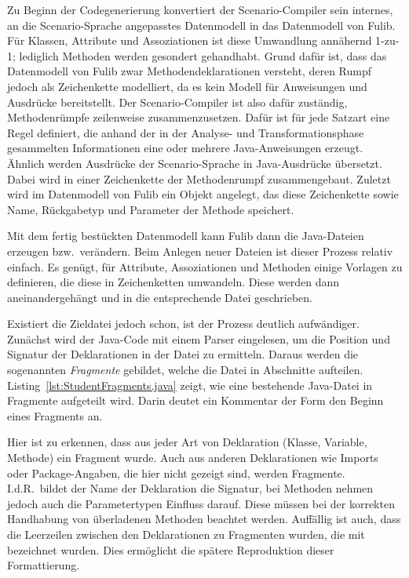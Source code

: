 Zu Beginn der Codegenerierung konvertiert der Scenario-Compiler sein internes, an die Scenario-Sprache angepasstes Datenmodell in das Datenmodell von Fulib.
Für Klassen, Attribute und Assoziationen ist diese Umwandlung annähernd 1-zu-1;
lediglich Methoden werden gesondert gehandhabt.
Grund dafür ist, dass das Datenmodell von Fulib zwar Methodendeklarationen versteht,
deren Rumpf jedoch als Zeichenkette modelliert,
da es kein Modell für Anweisungen und Ausdrücke bereitstellt.
Der Scenario-Compiler ist also dafür zuständig, Methodenrümpfe zeilenweise zusammenzusetzen.
Dafür ist für jede Satzart eine Regel definiert, die anhand der in der Analyse- und Transformationsphase gesammelten Informationen eine oder mehrere Java-Anweisungen erzeugt.
Ähnlich werden Ausdrücke der Scenario-Sprache in Java-Ausdrücke übersetzt.
Dabei wird in einer Zeichenkette der Methodenrumpf zusammengebaut.
Zuletzt wird im Datenmodell von Fulib ein Objekt angelegt, das diese Zeichenkette sowie Name, Rückgabetyp und Parameter der Methode speichert.

Mit dem fertig bestückten Datenmodell kann Fulib dann die Java-Dateien erzeugen bzw.\ verändern.
Beim Anlegen neuer Dateien ist dieser Prozess relativ einfach.
Es genügt, für Attribute, Assoziationen und Methoden einige Vorlagen zu definieren,
die diese in Zeichenketten umwandeln.
Diese werden dann aneinandergehängt und in die entsprechende Datei geschrieben.

Existiert die Zieldatei jedoch schon, ist der Prozess deutlich aufwändiger.
Zunächst wird der Java-Code mit einem Parser eingelesen, um die Position und Signatur der Deklarationen in der Datei zu ermitteln.
Daraus werden die sogenannten \emph{Fragmente} gebildet, welche die Datei in Abschnitte aufteilen.
Listing~\ref{lst:StudentFragments.java} zeigt, wie eine bestehende Java-Datei in Fragmente aufgeteilt wird.
Darin deutet ein Kommentar der Form  den Beginn eines Fragments an.


Hier ist zu erkennen, dass aus jeder Art von Deklaration (Klasse, Variable, Methode) ein Fragment wurde.
Auch aus anderen Deklarationen wie Imports oder Package-Angaben, die hier nicht gezeigt sind,
werden Fragmente.
I.d.R.\ bildet der Name der Deklaration die Signatur,
bei Methoden nehmen jedoch auch die Parametertypen Einfluss darauf.
Diese müssen bei der korrekten Handhabung von überladenen Methoden beachtet werden.
Auffällig ist auch, dass die Leerzeilen zwischen den Deklarationen zu Fragmenten wurden, die mit  bezeichnet wurden.
Dies ermöglicht die spätere Reproduktion dieser Formattierung.

